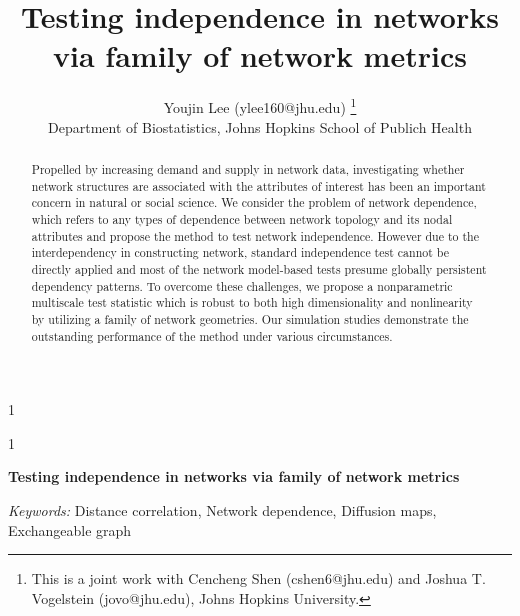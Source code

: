 \documentclass[11pt]{article}
\theoremstyle{definition}
\newcommand{\blind}{1}
\begin{document}
\def\spacingset#1{\renewcommand{\baselinestretch}%
{#1}\small\normalsize} \spacingset{1}



\blind
{
  \title{\bf Testing independence in networks via family of network metrics}
  \author{Youjin Lee (ylee160@jhu.edu) \thanks{
    This is a joint work with Cencheng Shen (cshen6@jhu.edu) and Joshua T. Vogelstein (jovo@jhu.edu), Johns Hopkins University.}\hspace{.2cm}\\
    Department of Biostatistics, Johns Hopkins School of Publich Health}
\date{}
  \maketitle
} \fi

\blind
{
  \bigskip
  \bigskip
  \bigskip
  \begin{center}
    {\LARGE\bf Testing independence in networks via family of network metrics}
\end{center}
  \medskip
} \fi

\begin{abstract}
Propelled by increasing demand and supply in network data, investigating whether network structures are associated with the attributes of interest has been an important concern in natural or social science. We consider the problem of network dependence, which refers to any types of dependence between network topology and its nodal attributes and propose the method to test network independence. However due to the interdependency in constructing network, standard independence test cannot be directly applied and most of the network model-based tests presume globally persistent dependency patterns. To overcome these challenges, we propose a nonparametric multiscale test statistic which is robust to both high dimensionality and nonlinearity by utilizing a family of network geometries. Our simulation studies demonstrate the outstanding performance of the method under various circumstances. 
\end{abstract}

\noindent%
{\it Keywords:} Distance correlation, Network dependence, Diffusion maps, Exchangeable graph

\sloppy
\doublespacing
\end{document}
